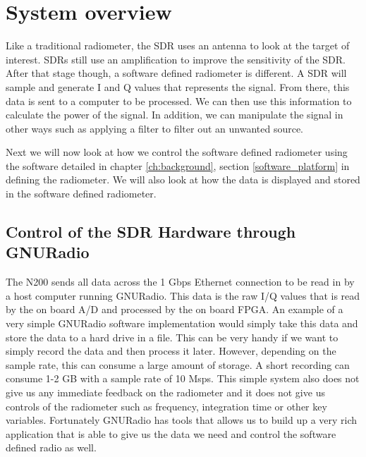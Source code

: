 \section{System overview}

Like a traditional radiometer, the SDR uses an antenna to look at the target of interest.  SDRs still use an amplification to improve the sensitivity of the SDR. After that stage though, a software defined radiometer is different.  A SDR will sample and generate I and Q values that represents the signal.  From there, this data is sent to a computer to be processed.  We can then use this information to calculate the power of the signal.  In addition, we can manipulate the signal in other ways such as applying a filter to filter out an unwanted source.



Next we will now look at how we control the software defined radiometer using the software detailed in chapter \ref{ch:background}, section \ref{software_platform} in defining the radiometer.  We will also look at how the data is displayed and stored in the software defined radiometer.

\subsection{Control of the SDR Hardware through GNURadio}
The N200 sends all data across the 1 Gbps Ethernet connection to be read in by a host computer running GNURadio.  This data is the raw I/Q values that is read by the on board A/D and processed by the on board FPGA.  An example of a very simple GNURadio software implementation would simply take this data and store the data to a hard drive in a file.  This can be very handy if we want to simply record the data and then process it later.  However, depending on the sample rate, this can consume a large amount of storage.  A short recording can  consume 1-2 GB with a sample rate of 10 Msps.  This simple system also does not give us any immediate feedback on the radiometer and it does not give us controls of the radiometer such as frequency, integration time or other key variables.  Fortunately GNURadio has tools that allows us to build up a very rich application that is able to give us the data we need and control the software defined radio as well.

